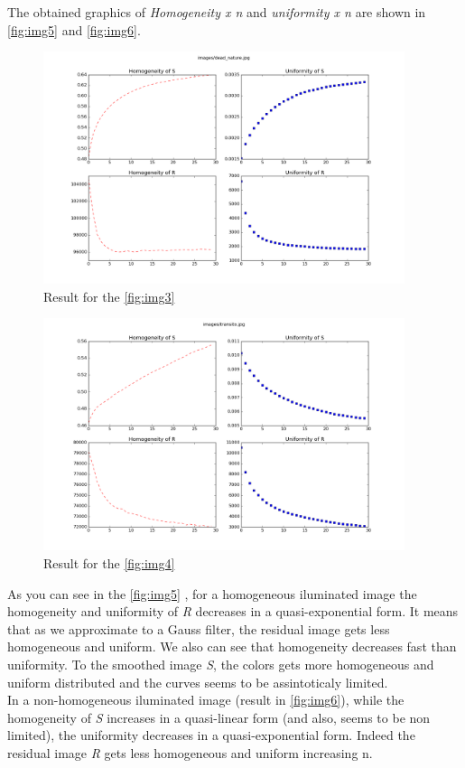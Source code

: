 \documentclass[a4paper,10pt]{article}
\begin{document}
The obtained graphics of \textit{Homogeneity x n} and \textit{uniformity x n} are shown in \autoref{fig:img5} and \autoref{fig:img6}.

\begin{figure}[H]
  \centering
  \includegraphics[width=400px]{../results/ex2_dead_nature}
  \caption{Result for the \autoref{fig:img3} }
  \label{fig:img5}
\end{figure}

\begin{figure}[H]
  \centering
  \includegraphics[width=400px]{../results/ex2_transito}
  \caption{Result for the \autoref{fig:img4} }
  \label{fig:img6}
\end{figure}

As you can see in the \autoref{fig:img5} , for a homogeneous iluminated image the homogeneity and uniformity of \textit{R} decreases in a quasi-exponential form. 
It means that as we approximate to a Gauss filter, the residual image gets less homogeneous and uniform. We also can see that homogeneity 
decreases fast than uniformity. To the smoothed image \textit{S}, the colors gets more homogeneous and uniform distributed and the 
curves seems to be assintoticaly limited. \\
In a non-homogeneous iluminated image (result in \autoref{fig:img6}), while the homogeneity of \textit{S} increases in a quasi-linear form (and also, seems to be non limited),
the uniformity decreases in a quasi-exponential form. Indeed the residual image \textit{R} gets less homogeneous and uniform increasing n.
\end{document}
